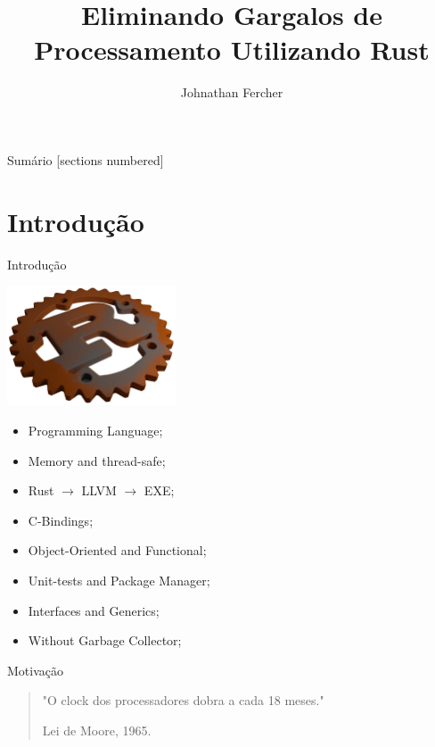 \documentclass[aspectratio=169]{beamer}
\title{Eliminando Gargalos de Processamento \newline Utilizando Rust}
\date{}
\author{Johnathan Fercher}
\begin{document}
\maketitle

\begin{frame}{Sumário}
  [sections numbered]
  \tableofcontents[hideallsubsections]
\end{frame}

\section{Introdução}
\begin{frame}{Introdução}
	\begin{multicols}{2}		
		\begin{center}
			\includegraphics[width=5cm]{imgs/rust3d.png}
		\end{center}
		\footnotesize
		\begin{itemize}
			\item Programming Language;
			\item Memory and thread-safe;
			\item Rust $\rightarrow$ LLVM $\rightarrow$ EXE;
			\item C-Bindings;
			\item Object-Oriented and Functional;
			\item Unit-tests and Package Manager;
			\item Interfaces and Generics;
			\item Without Garbage Collector;
		\end{itemize}	
	\end{multicols}
\end{frame}

\begin{frame}{Motivação}
	\begin{quote}
		\hspace{0.5cm}"O clock dos processadores dobra a cada 18 meses."
		
		\hspace{8.2cm}Lei de Moore, 1965.
	\end{quote}
\end{frame}
\end{document}
